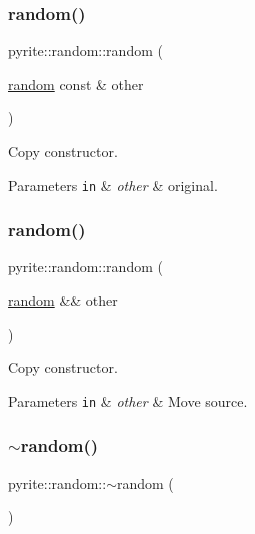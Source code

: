 \subsubsection{\texorpdfstring{random()}{random()}\hspace{0.1cm}{\footnotesize\ttfamily [4/5]}}
{\footnotesize\ttfamily pyrite\+::random\+::random (\begin{DoxyParamCaption}\item[{\mbox{\hyperlink{classpyrite_1_1random}{random}} const \&}]{other }\end{DoxyParamCaption})}

Copy constructor.


\begin{DoxyParams}[1]{Parameters}
\mbox{\tt in}  & {\em other} & original. \\
\hline
\end{DoxyParams}
\mbox{\label{classpyrite_1_1random_a263c5a878b5aaa150d915d765420f294}} 
\subsubsection{\texorpdfstring{random()}{random()}\hspace{0.1cm}{\footnotesize\ttfamily [5/5]}}
{\footnotesize\ttfamily pyrite\+::random\+::random (\begin{DoxyParamCaption}\item[{\mbox{\hyperlink{classpyrite_1_1random}{random}} \&\&}]{other }\end{DoxyParamCaption})}

Copy constructor.


\begin{DoxyParams}[1]{Parameters}
\mbox{\tt in}  & {\em other} & Move source. \\
\hline
\end{DoxyParams}
\mbox{\label{classpyrite_1_1random_ae8d71dcc48a9eb0fe84525b368b91e05}} 
\subsubsection{\texorpdfstring{$\sim$random()}{~random()}}
{\footnotesize\ttfamily pyrite\+::random\+::$\sim$random (\begin{DoxyParamCaption}{ }\end{DoxyParamCaption})\hspace{0.3cm}{\ttfamily [default]}}

